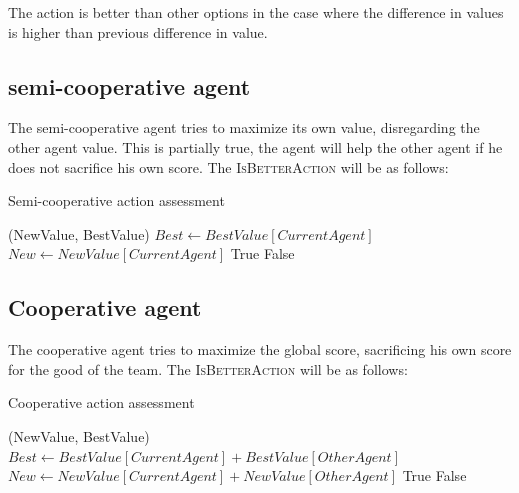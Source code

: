 \documentclass{article}                     %
\begin{document}
	The action is better than other options in the case where the difference in values is higher than previous difference in value. 


	\subsection{semi-cooperative agent}
	The semi-cooperative agent tries to maximize its own value, disregarding the other agent value. This is partially true, the agent will help the other agent if he does not sacrifice his own score.
	The \textsc{IsBetterAction} will be as follows:
	
	\begin{algorithm}[H]
		\label{al:coop}
		\caption{Semi-cooperative action assessment}
		\begin{algorithmic}[1]
			(NewValue, BestValue)
			\State $ Best \leftarrow BestValue[CurrentAgent]$
			\State $ New \leftarrow NewValue[CurrentAgent]$
			\State  \Return True
			\Else   \Return False
			\EndIf
			\EndProcedure
		\end{algorithmic}
	\end{algorithm}

	
	\subsection{Cooperative agent}
	
	The cooperative agent tries to maximize the global score, sacrificing his own score for the good of the team. 
	The \textsc{IsBetterAction} will be as follows:
	\begin{algorithm}[H]
		\label{al:semi}
		\caption{Cooperative action assessment}
		\begin{algorithmic}[1]
			(NewValue, BestValue)
			\State $ Best \leftarrow BestValue[CurrentAgent] + BestValue[OtherAgent]$
			\State $ New \leftarrow NewValue[CurrentAgent] + NewValue[OtherAgent]  $
			\State  \Return True
			\Else   \Return False
			\EndIf
			\EndProcedure
		\end{algorithmic}
	\end{algorithm}

	
\end{document}
